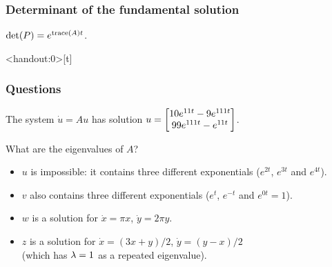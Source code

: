 \documentclass[9pt]{beamer}
\begin{document}
\begin{frame}[t]
 \frametitle{Determinant of the fundamental solution}
 
 \begin{proposition*}{}
  $\det(P)=e^{\operatorname{trace}(A)t}$.
 \end{proposition*}

 \bigskip
\end{frame}

\begin{frame}<handout:0>[t]
 \frametitle{Questions}
 
 The system $\dot{u}=Au$ has solution 
 $\displaystyle
   u = \left[\begin{matrix} 10 e^{11t} - 9 e^{111t} \\ 99 e^{111t} - e^{11t} \end{matrix}\right] 
 $. 

 What are the eigenvalues of $A$?

 \bigskip


 \bigskip


 \begin{itemize}
  \item<4-> $u$ is impossible: it contains three different
   exponentials ($e^{2t}$, $e^{3t}$ and $e^{4t}$).
  \item<5-> $v$ also contains three different
   exponentials ($e^{t}$, $e^{-t}$ and $e^{0t}=1$).
  \item<6-> $w$ is a solution for $\dot{x}=\pi x$, $\dot{y}=2\pi y$.
  \item<7-> $z$ is a solution for $\dot{x}=(3x+y)/2$, $\dot{y}=(y-x)/2$\\
   (which has $\lambda=1$ as a repeated eigenvalue). 
 \end{itemize}
\end{frame}
\end{document}
